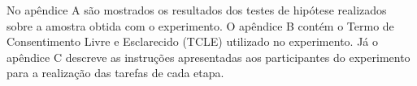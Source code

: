  No apêndice A são mostrados os resultados dos testes de hipótese realizados sobre a amostra obtida com o experimento.
 O apêndice B contém o Termo de Consentimento Livre e Esclarecido (TCLE) utilizado no experimento.
 Já o apêndice C descreve as instruções apresentadas aos participantes do experimento para a realização das tarefas de cada etapa.


